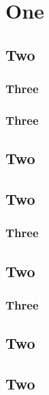 
\chapter{One}

\startcontents[chapters]

\minicontents

\spirals

\section{Two}
\lipsum[1]
\subsection{Three}
\lipsum[1]
\subsection{Three}
\lipsum[1]
\section{Two}
\lipsum[1]
\section{Two}
\lipsum[1]
\subsection{Three}
\section{Two}
\subsection{Three}
\section{Two}
\section{Two}

\stopcontents[chapters]
